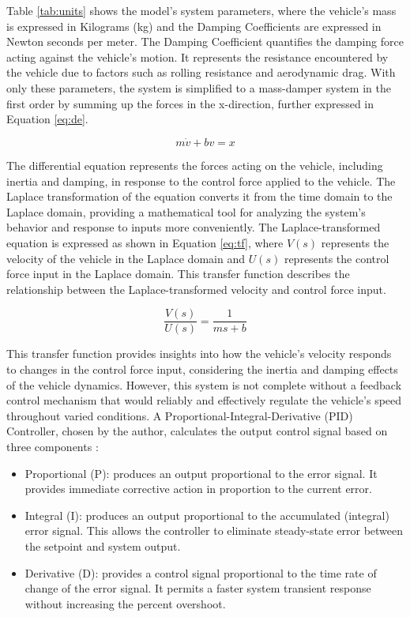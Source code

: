 \documentclass{article}
\begin{document}
Table \ref{tab:units} shows the model's system parameters, where the vehicle's mass is expressed in Kilograms (kg) and the Damping Coefficients are expressed in Newton seconds per meter. The Damping Coefficient quantifies the damping force acting against the vehicle's motion. It represents the resistance encountered by the vehicle due to factors such as rolling resistance and aerodynamic drag. With only these parameters, the system is simplified to a mass-damper system in the first order by summing up the forces in the x-direction, further expressed in Equation \ref{eq:de}.

\begin{equation}
    m\dot{v}+bv=x
    \label{eq:de}
\end{equation}

The differential equation represents the forces acting on the vehicle, including inertia and damping, in response to the control force applied to the vehicle. The Laplace transformation of the equation converts it from the time domain to the Laplace domain, providing a mathematical tool for analyzing the system's behavior and response to inputs more conveniently. The Laplace-transformed equation is expressed as shown in Equation \ref{eq:tf}, where $V(s)$ represents the velocity of the vehicle in the Laplace domain and $U(s)$ represents the control force input in the Laplace domain. This transfer function describes the relationship between the Laplace-transformed velocity and control force input.

\begin{equation}
\frac{V(s)}{U(s)} = \frac{1}{ms + b}
\label{eq:tf}
\end{equation}

This transfer function provides insights into how the vehicle's velocity responds to changes in the control force input, considering the inertia and damping effects of the vehicle dynamics. However, this system is not complete without a feedback control mechanism that would reliably and effectively regulate the vehicle's speed throughout varied conditions. A Proportional-Integral-Derivative (PID) Controller, chosen by the author, calculates the output control signal based on three components \cite{pid:2020}:

\begin{itemize}
    \item Proportional (P): produces an output proportional to the error signal. It provides immediate corrective action in proportion to the current error.
    \item Integral (I):  produces an output proportional to the accumulated (integral) error signal. This allows the controller to eliminate steady-state error between the setpoint and system output.
    \item Derivative (D): provides a control signal proportional to the time rate of change of the error signal. It permits a faster system transient response without increasing the percent overshoot.
\end{itemize}
\end{document}
